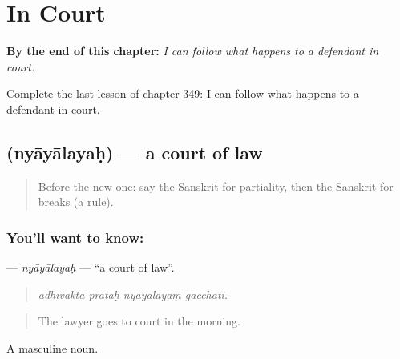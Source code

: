 
\chapter{In Court}
\label{ch:sa-in-court}

\begin{chapteropening}
\textbf{By the end of this chapter:} \emph{I can follow what happens to a defendant in court.}

Complete the last lesson of chapter 349: I can follow what happens to a defendant in court.
\end{chapteropening}

\section[\texorpdfstring{\sk{न्यायालयः} (nyāyālayaḥ)}{न्यायालयः (nyāyālayaḥ)}]{ (nyāyālayaḥ) — a court of law}

\label{lesson:SA-C349-nyayalayah}



\begin{quote}
Before the new one: say the Sanskrit for partiality, then the Sanskrit for breaks (a rule).
\end{quote}

\subsection*{You'll want to know: }
\textbf{} — \emph{nyāyālayaḥ} — \textquotedblleft{}a court of law\textquotedblright{}.

\begin{quote}
   
\end{quote}

\begin{quote}
\emph{adhivaktā prātaḥ nyāyālayaṃ gacchati.}
\end{quote}

\begin{quote}
The lawyer goes to court in the morning.
\end{quote}

A masculine noun.

